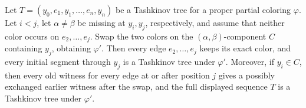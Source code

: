 \begin{helper}
Let \(T=(y_0,e_1,y_1,\ldots,e_n,y_n)\) be a Tashkinov tree for a
proper partial coloring \(\varphi\).  Let \(i<j\), let
\(\alpha\ne\beta\) be missing at \(y_i,y_j\), respectively, and assume
that neither color occurs on \(e_2,\ldots,e_j\).  Swap the two colors on
the \((\alpha,\beta)\)-component \(C\) containing \(y_j\), obtaining
\(\varphi'\).  Then every edge \(e_2,\ldots,e_j\) keeps its exact color,
and every initial segment through \(y_j\) is a Tashkinov tree under
\(\varphi'\).  Moreover, if \(y_i\in C\), then every old witness for
every edge at or after position \(j\) gives a possibly exchanged earlier
witness after the swap, and the full displayed sequence \(T\) is a
Tashkinov tree under \(\varphi'\).
\end{helper}
